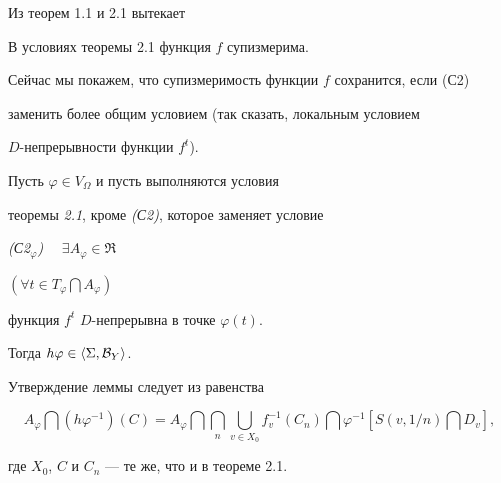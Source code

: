Из теорем 1.1 и 2.1 вытекает





\begin{cors} В условиях теоремы 2.1 функция $f$ супизмерима.


\end{cors}





Сейчас мы покажем, что супизмеримость функции $f$ сохранится, если (С2)


заменить более общим условием (так сказать, локальным условием


$D$-непрерывности функции $f^t$).





\begin{lems} Пусть $\varphi\in V_\Omega$ и пусть выполняются условия


теоремы {\em 2.1}, кроме {\em (С2)}, которое заменяет условие





{\em (С2${}_\varphi$)} $\quad\exists A_\varphi\in\Re$ \;


$(\forall t\in T_\varphi\bigcap A_\varphi)$


функция $f^t$ \; $D$-непрерывна в точке $\varphi (t)$.





{\noindent Тогда $h\varphi\in\langle \Sigma ,{\cal B}_Y\rangle $.}


\end{lems}





\begin{pf} Утверждение леммы следует из равенства


$$


A_\varphi\bigcap(h\varphi^{-1})(C)=A_\varphi \bigcap 


\bigcap\limits_n\bigcup\limits_{v\in X_0}f_v^{-1}(C_n)\bigcap\varphi^{-1}


[S(v,1/n)\bigcap D_v],


$$


где $X_0$, $C$ и $C_n$ --- те же, что и в теореме 2.1.


\end{pf}





